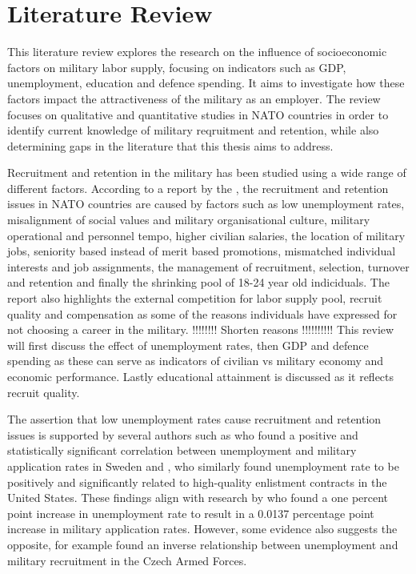 \chapter{Literature Review}

This literature review explores the research on the influence of socioeconomic 
factors on military labor supply, focusing on indicators such as GDP,
unemployment, education and defence spending. It aims to investigate how these 
factors impact the attractiveness of the military as an employer. The review focuses 
on qualitative and quantitative studies in NATO countries in order to identify 
current knowledge of military reqruitment and retention, while also determining 
gaps in the literature that this thesis aims to address. 

Recruitment and retention in the military has been studied using a wide range of
different factors. According to a report by the \textcite{nato_research_and_technology_organization_recruiting_2007}, the recruitment and retention issues in NATO countries are 
caused by factors such as low unemployment rates, misalignment of social values and
military organisational culture, military operational and personnel tempo,
higher civilian salaries, the location of military jobs, seniority based
instead of merit based promotions, mismatched individual interests and job assignments,
the management of recruitment, selection, turnover and retention and finally the 
shrinking pool of 18-24 year old indiciduals. The report also highlights the external
competition for labor supply pool, recruit quality and compensation as some of the reasons
individuals have expressed for not choosing a career in the military.
!!!!!!!! Shorten reasons !!!!!!!!!!
This review will first discuss
the effect of unemployment rates, then GDP and defence spending as these can
serve as indicators of civilian vs military economy and economic performance. 
Lastly educational attainment is discussed as it reflects recruit quality.

The assertion that low unemployment rates 
cause recruitment and retention issues is supported by several authors such as 
\textcite{backstrom_are_2019} who found a positive and statistically significant correlation 
between unemployment and military application rates in Sweden and \textcite{asch_cash_2010},
who similarly found unemployment rate to be positively and significantly related to
high-quality enlistment contracts in the United States. These findings align with 
research by \textcite{balcaen_unemployment_2025} who found a one percent point increase in 
unemployment rate to result in a 0.0137 percentage point increase in military 
application rates. However, some evidence also suggests the opposite, for example 
\textcite{holcner_military_2021} found an inverse relationship between unemployment and military 
recruitment in the Czech Armed Forces.

